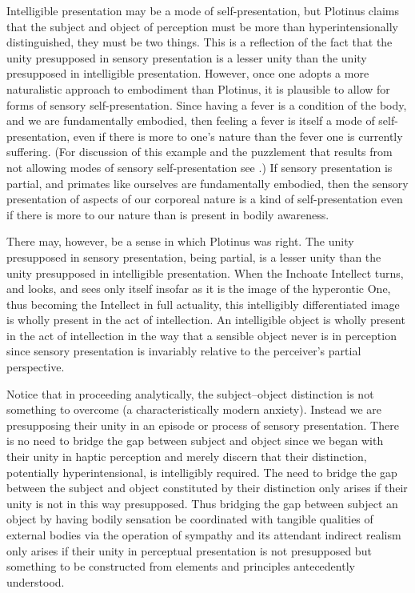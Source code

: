 Intelligible presentation may be a mode of self-presentation, but Plotinus claims that the subject and object of perception must be more than hyperintensionally distinguished, they must be two things. This is a reflection of the fact that the unity presupposed in sensory presentation is a lesser unity than the unity presupposed in intelligible presentation. However, once one adopts a more naturalistic approach to embodiment than Plotinus, it is plausible to allow for forms of sensory self-presentation. Since having a fever is a condition of the body, and we are fundamentally embodied, then feeling a fever is itself a mode of self-presentation, even if there is more to one's nature than the fever one is currently suffering. (For discussion of this example and the puzzlement that results from not allowing modes of sensory self-presentation see \citealt{Yrjonsuuri:2008aa}.) If sensory presentation is partial, and primates like ourselves are fundamentally embodied, then the sensory presentation of aspects of our corporeal nature is a kind of self-presentation even if there is more to our nature than is present in bodily awareness. 

There may, however, be a sense in which Plotinus was right. The unity presupposed in sensory presentation, being partial, is a lesser unity than the unity presupposed in intelligible presentation. When the Inchoate Intellect turns, and looks, and sees only itself insofar as it is the image of the hyperontic One, thus becoming the Intellect in full actuality, this intelligibly differentiated image is wholly present in the act of intellection. An intelligible object is wholly present in the act of intellection in the way that a sensible object never is in perception since sensory presentation is invariably relative to the perceiver's partial perspective.


Notice that in proceeding analytically, the subject--object distinction is not something to overcome (a characteristically modern anxiety). Instead we are presupposing their unity in an episode or process of sensory presentation. There is no need to bridge the gap between subject and object since we began with their unity in haptic perception and merely discern that their distinction, potentially hyperintensional, is intelligibly required. The need to bridge the gap between the subject and object constituted by their distinction only arises if their unity is not in this way presupposed. Thus bridging the gap between subject an object by having bodily sensation be coordinated with tangible qualities of external bodies via the operation of sympathy and its attendant indirect realism only arises if their unity in perceptual presentation is not presupposed but something to be constructed from elements and principles antecedently understood. 

